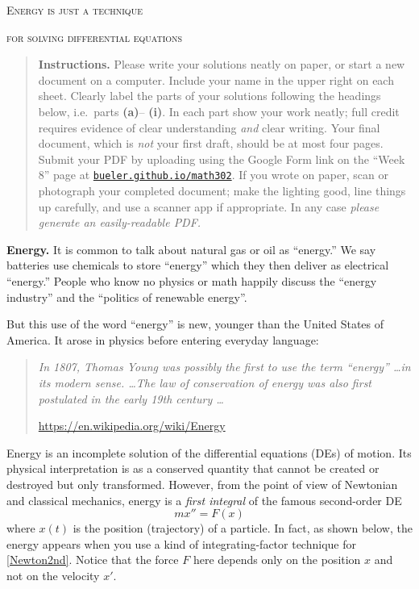 \documentclass[12pt]{article}
\theoremstyle{definition}
\begin{document}
\renewcommand{\d}{\displaystyle}

\strut
\centerline{{\Large \textsc{Energy is just a technique}}}

\medskip

\centerline{{\Large \textsc{for solving differential equations}}}

\medskip
\small
\begin{quote}
\textbf{Instructions.}  Please write your solutions neatly on paper, or start a new document on a computer.  Include your name in the upper right on each sheet.  Clearly label the parts of your solutions following the headings below, i.e.~parts \textbf{(a)}-- \textbf{(i)}.  In each part show your work neatly; full credit requires evidence of clear understanding \emph{and} clear writing.  Your final document, which is \emph{not} your first draft, should be at most four pages.  Submit your PDF by uploading using the Google Form link on the ``Week 8'' page at \href{https://bueler.github.io/math302/index.html}{\texttt{bueler.github.io/math302}}.  If you wrote on paper, scan or photograph your completed document; make the lighting good, line things up carefully, and use a scanner app if appropriate.  In any case \emph{please generate an easily-readable PDF.}
\end{quote}

\normalsize
\bigskip
\renewcommand{\baselinestretch}{1.1}

\textbf{Energy.}  It is common to talk about natural gas or oil as ``energy.''   We say batteries use chemicals to store ``energy'' which they then deliver as electrical ``energy.''  People who know no physics or math happily discuss the ``energy industry'' and the ``politics of renewable energy''.

But this use of the word ``energy'' is new, younger than the United States of America.  It arose in physics before entering everyday language:

\small

\begin{quotation}
\noindent \emph{In 1807, Thomas Young was possibly the first to use the term ``energy'' \dots in its modern sense.  \dots  The law of conservation of energy was also first postulated in the early 19th century \dots}

\hfill \url{https://en.wikipedia.org/wiki/Energy}
\end{quotation}

\normalsize
Energy is an incomplete solution of the differential equations (DEs) of motion.  Its physical interpretation is as a conserved quantity that cannot be created or destroyed but only transformed.  However, from the point of view of Newtonian and classical mechanics, energy is a \emph{first integral} of the famous second-order DE
\begin{equation}
    mx''=F(x)  \label{Newton2nd}
\end{equation}
where $x(t)$ is the position (trajectory) of a particle.  In fact, as shown below, the energy appears when you use a kind of integrating-factor technique for \eqref{Newton2nd}.  Notice that the force $F$ here depends only on the position $x$ and not on the velocity $x'$.
\end{document}
